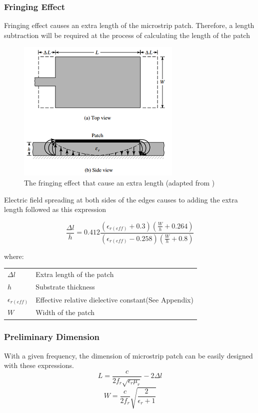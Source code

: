 \documentclass[11pt,a4paper]{article}
\makeatletter
\newenvironment{conditions}[1][where:]
  {#1 \begin{tabular}[t]{>{$}l<{$} @{${}={}$} l}}
  {\end{tabular}}
\makeatother
\begin{document}
\subsubsection{Fringing Effect}

Fringing effect causes an extra length of the microstrip patch. Therefore, a length subtraction will be required at the process of calculating the length of the patch\cite{CoB:05}

\begin{figure}[ht]
\includegraphics{fringingeffect.png}
\centering
\caption{The fringing effect that cause an extra length (adapted from )}
\end{figure}

Electric field spreading at both sides of the edges causes to adding the extra length followed as this expression\cite{CoB:05}

\begin{equation} \label{eq:fringing}
\frac{\Delta l}{h}=0.412\frac{(\epsilon_{r(eff)}+0.3)(\frac{W}{h} + 0.264)}{(\epsilon_{r(eff)}-0.258)(\frac{W}{h} + 0.8)}
\end{equation}

\begin{conditions}
 \Delta l    	 	&	Extra length of the patch \\
 		h     		&	Substrate thickness \\   
 \epsilon_{r(eff)} 	&	Effective relative dielective constant(See Appendix) \\
 		W			&	Width of the patch
\end{conditions}

\subsubsection{Preliminary Dimension}

With a given frequency, the dimension of microstrip patch can be easily designed with these expressions\cite{CoB:05,NoK:05}.
\begin{equation}
	L = \frac{c}{2f_{r}\sqrt{\epsilon_r\mu_r}} - 2\Delta l
\end{equation}
\begin{equation}
    W = \frac{c}{2f_{r}}\sqrt{\frac{2}{\epsilon_{r} + 1}}
\end{equation}
\end{document}
